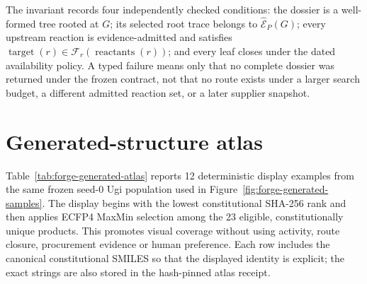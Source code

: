 \documentclass{article}
\begin{document}
The invariant records four independently checked conditions: the dossier is a well-formed tree
rooted at $G$; its selected root trace belongs to $\widehat{\mathcal E}_P(G)$; every upstream
reaction is evidence-admitted and satisfies
$\operatorname{target}(r)\in\mathcal F_r(\operatorname{reactants}(r))$; and every leaf closes under
the dated availability policy. A typed failure means only that no complete dossier was returned
under the frozen contract, not that no route exists under a larger search budget, a different
admitted reaction set, or a later supplier snapshot.

\clearpage

\clearpage

\section{Generated-structure atlas}
\label{app:atlas}

Table~\ref{tab:forge-generated-atlas} reports 12 deterministic display examples
from the same frozen seed-0 Ugi population used in Figure~\ref{fig:forge-generated-samples}. The
display begins with the lowest constitutional SHA-256 rank and then applies ECFP4 MaxMin selection
among the 23 eligible, constitutionally unique products. This promotes visual coverage without using
activity, route closure, procurement evidence or human preference. Each row includes the canonical
constitutional SMILES so that the displayed identity is explicit; the exact strings are also stored
in the hash-pinned atlas receipt.
\end{document}
